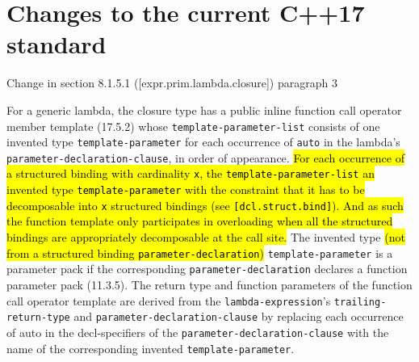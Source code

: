 \documentclass{article}
\DeclareRobustCommand{\hlgreen}[1]{{\sethlcolor{green}\hl{#1}}}
\begin{document}
\newpage
\section{Changes to the current C++17 standard}
Change in section 8.1.5.1 ([expr.prim.lambda.closure]) paragraph 3

For a generic lambda, the closure type has a public inline function call
operator member template (17.5.2) whose \texttt{template-parameter-list}
consists of one invented type \texttt{template-parameter} for each occurrence
of \texttt{auto} in the lambda’s \texttt{parameter-declaration-clause}, in
order of appearance.  \hlgreen{For each occurrence of a structured binding with
cardinality \texttt{x}, the \texttt{template-parameter-list} an invented type
\texttt{template-parameter} with the constraint that it has to be decomposable
into \texttt{x} structured bindings (see \texttt{[dcl.struct.bind]}).  And as
such the function template only participates in overloading when all the
structured bindings are appropriately decomposable at the call site.} The
invented type \hlgreen{(not from a structured binding
\texttt{parameter-declaration})} \texttt{template-parameter} is a parameter
pack if the corresponding \texttt{parameter-declaration} declares a function
parameter pack (11.3.5).  The return type and function parameters of the
function call operator template are derived from the
\texttt{lambda-expression}’s \texttt{trailing-return-type} and
\texttt{parameter-declaration-clause} by replacing each occurrence of auto in
the decl-specifiers of the \texttt{parameter-declaration-clause} with the name
of the corresponding invented \texttt{template-parameter}.
\end{document}
